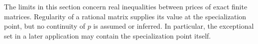 The limits in this section concern real inequalities between prices
of exact finite matrices.  Regularity of a rational matrix supplies
its value at the specialization point, but no continuity of $p$ is
assumed or inferred.  In particular, the exceptional set in a later
application may contain the specialization point itself.
